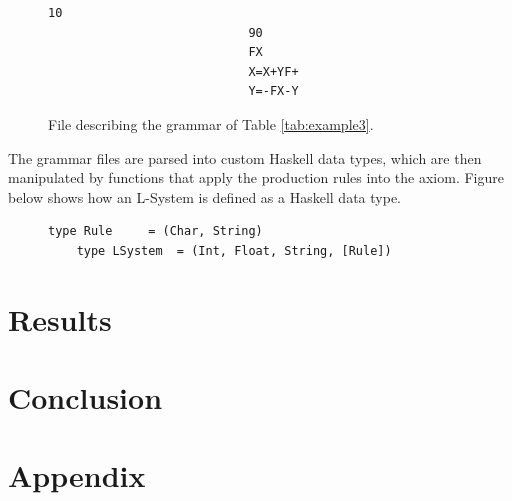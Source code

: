 \documentclass{article}
\begin{document}
\begin{figure}[!h]
\centering
\begin{lstlisting}[style=TextStyle]
                            10
                            90
                            FX
                            X=X+YF+
                            Y=-FX-Y
\end{lstlisting}
\vskip -6pt
\caption{File describing the grammar of Table \ref{tab:example3}.}
\label{fig:file}
\end{figure}

The grammar files are parsed into custom Haskell data types, which are then
manipulated by functions that apply the production rules into the axiom. Figure
below shows how an L-System is defined as a Haskell data type.

\begin{figure}[!h]
\centering
\begin{lstlisting}[style=BashStyle]
    type Rule     = (Char, String)
    type LSystem  = (Int, Float, String, [Rule])
\end{lstlisting}
\vskip -6pt
\end{figure}

\section{Results}
\label{results}


\section{Conclusion}
\label{conclusion}

\section{Appendix}
\end{document}
